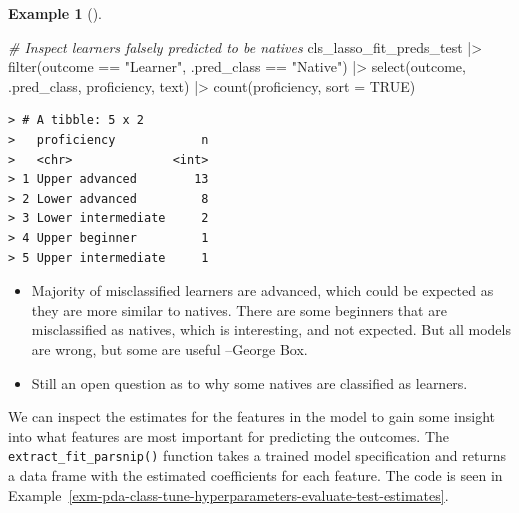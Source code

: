 \documentclass[
  letterpaper,
  DIV=11,
  numbers=noendperiod]{scrreprt}
\newenvironment{Shaded}{\begin{snugshade}}{\end{snugshade}}
\newcommand{\AttributeTok}[1]{\textcolor[rgb]{0.00,0.00,0.00}{#1}}
\newcommand{\CommentTok}[1]{\textcolor[rgb]{0.00,0.00,0.00}{\textit{#1}}}
\newcommand{\ConstantTok}[1]{\textcolor[rgb]{0.00,0.00,0.00}{#1}}
\newcommand{\FunctionTok}[1]{\textcolor[rgb]{0.00,0.00,0.00}{#1}}
\newcommand{\NormalTok}[1]{\textcolor[rgb]{0.00,0.00,0.00}{#1}}
\newcommand{\SpecialCharTok}[1]{\textcolor[rgb]{0.00,0.00,0.00}{#1}}
\newcommand{\StringTok}[1]{\textcolor[rgb]{0.00,0.00,0.00}{#1}}
\theoremstyle{definition}
\newtheorem{example}{Example}[chapter]
\theoremstyle{remark}
\begin{document}
\begin{example}[]
\begin{Shaded}
\begin{Highlighting}[]
\CommentTok{\# Inspect learners falsely predicted to be natives}
\NormalTok{cls\_lasso\_fit\_preds\_test }\SpecialCharTok{|\textgreater{}}
  \FunctionTok{filter}\NormalTok{(outcome }\SpecialCharTok{==} \StringTok{"Learner"}\NormalTok{, .pred\_class }\SpecialCharTok{==} \StringTok{"Native"}\NormalTok{) }\SpecialCharTok{|\textgreater{}}
  \FunctionTok{select}\NormalTok{(outcome, .pred\_class, proficiency, text) }\SpecialCharTok{|\textgreater{}}
  \FunctionTok{count}\NormalTok{(proficiency, }\AttributeTok{sort =} \ConstantTok{TRUE}\NormalTok{)}
\end{Highlighting}
\end{Shaded}

\begin{verbatim}
> # A tibble: 5 x 2
>   proficiency            n
>   <chr>              <int>
> 1 Upper advanced        13
> 2 Lower advanced         8
> 3 Lower intermediate     2
> 4 Upper beginner         1
> 5 Upper intermediate     1
\end{verbatim}

\end{example}

\begin{itemize}
\item
  Majority of misclassified learners are advanced, which could be
  expected as they are more similar to natives. There are some beginners
  that are misclassified as natives, which is interesting, and not
  expected. But all models are wrong, but some are useful --George Box.
\item
  Still an open question as to why some natives are classified as
  learners.
\end{itemize}

We can inspect the estimates for the features in the model to gain some
insight into what features are most important for predicting the
outcomes. The \texttt{extract\_fit\_parsnip()} function takes a trained
model specification and returns a data frame with the estimated
coefficients for each feature. The code is seen in
Example~\ref{exm-pda-class-tune-hyperparameters-evaluate-test-estimates}.
\end{document}
